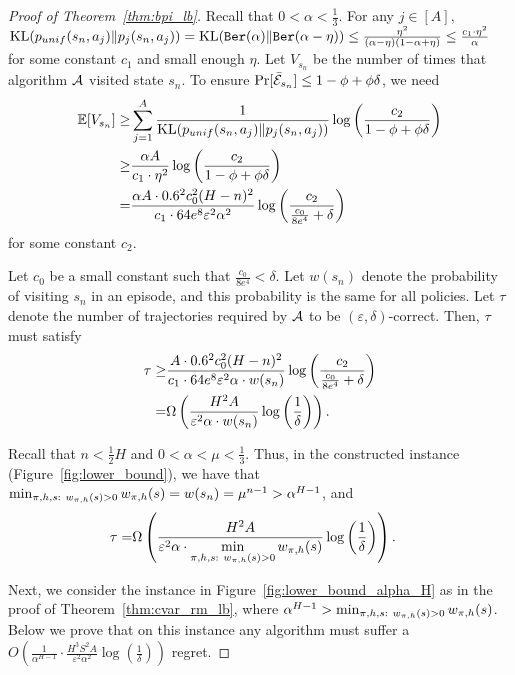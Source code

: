 \begin{proof}[Proof of Theorem~\ref{thm:bpi_lb}]
	Recall that $0<\alpha<\frac{1}{3}$. For any $j \in [A]$, $\textup{KL}(p_{unif}(s_n,a_j)\|p_j(s_n,a_j)) = \textup{KL}(\mathtt{Ber}(\alpha)\|\mathtt{Ber}(\alpha-\eta)) \leq \frac{\eta^2}{(\alpha-\eta) (1-\alpha+\eta)} \leq \frac{c_1 \cdot \eta^2}{\alpha}$ for some constant $c_1$ and small enough $\eta$.
	Let $V_{s_n}$ be the number of times that algorithm $\mathcal{A}$ visited state $s_n$.
	To ensure $\Pr[\bar{\mathcal{E}}_{s_n}]  \leq 1-\phi+\phi \delta$, we need 
	\begin{align*}
		\mathbb{E}[V_{s_n}] \geq & \sum_{j=1}^{A} \frac{1}{\textup{KL}(p_{unif}(s_n,a_j)\|p_j(s_n,a_j))} \log \left( \frac{c_2}{1-\phi+\phi \delta} \right)
		\\
		\geq & \frac{\alpha A}{c_1 \cdot \eta^2} \log \left( \frac{c_2}{1-\phi+\phi \delta} \right)
		\\
		= & \frac{\alpha A \cdot 0.6^2 c_0^2 (H-n)^2}{c_1 \cdot 64 e^8 \varepsilon^2 \alpha^2} \log \left( \frac{c_2}{\frac{c_0}{8e^4} + \delta} \right) 
	\end{align*}
	for some constant $c_2$.
	
	
	Let $c_0$ be a small constant such that $\frac{c_0}{8e^4} < \delta$. Let $w(s_n)$ denote the probability of visiting $s_n$ in an episode, and this probability is the same for all policies. 
	Let $\tau$ denote the number of trajectories required by $\mathcal{A}$ to be $(\varepsilon,\delta)$-correct.
	Then, $\tau$ must satisfy
	\begin{align*}
		\tau \geq & \frac{A \cdot 0.6^2 c_0^2  (H-n)^2}{c_1 \cdot 64 e^8 \varepsilon^2 \alpha \cdot w(s_n)} \log \left( \frac{c_2}{\frac{c_0}{8e^4} + \delta} \right)
		\\
		= & \Omega \left(  \frac{ H^2 A}{\varepsilon^2 \alpha \cdot w(s_n)} \log \left( \frac{1}{\delta} \right)  \right) .
	\end{align*}
	
	Recall that $n<\frac{1}{2}H$ and $0<\alpha<\mu<\frac{1}{3}$.
	Thus, in the constructed instance (Figure~\ref{fig:lower_bound}), we have that $\min_{\begin{subarray}{c}\pi,h,s:\  w_{\pi,h}(s)>0\end{subarray}} w_{\pi,h}(s)=w(s_n)=\mu^{n-1} > \alpha^{H-1}$, and
	\begin{align*}
		\tau = & \Omega \left(  \frac{ H^2 A}{\varepsilon^2 \alpha \cdot \min \limits_{\begin{subarray}{c}\pi,h,s:\  w_{\pi,h}(s)>0\end{subarray}} w_{\pi,h}(s)} \log \left( \frac{1}{\delta} \right)  \right) .
	\end{align*}
	
	Next, we consider the instance in Figure~\ref{fig:lower_bound_alpha_H} as in the proof of Theorem~\ref{thm:cvar_rm_lb}, where $\alpha^{H-1}>\min_{\begin{subarray}{c}\pi,h,s:\  w_{\pi,h}(s)>0\end{subarray}} w_{\pi,h}(s)$. Below we prove that on this instance any algorithm must suffer a $O( \frac{1}{\alpha^{H-1}} \cdot \frac{H^3 S^2 A}{\varepsilon^2 \alpha^2} \log (\frac{1}{\delta}) )$ regret.
	

\end{proof}
